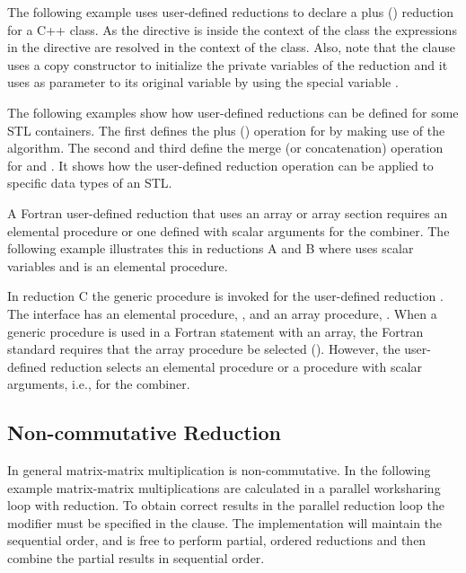 \pagebreak
{}


The following example uses user-defined reductions to declare a plus (\kcode{+}) 
reduction for a C++ class. As the  directive 
is inside the context of the  class the expressions in the 
 directive are resolved in the context of 
the class. Also, note that the  clause uses a copy 
constructor to initialize the private variables of the reduction and it uses 
as parameter to its original variable by using the special variable 
.


The following examples show how user-defined reductions can be defined for 
some STL containers. The first  defines the 
plus (\kcode{+}) operation for  by making use of the 
 algorithm. The second and third define the merge (or 
concatenation) operation for  and . 
It shows how the user-defined reduction operation can be applied to specific 
data types of an STL.


A Fortran user-defined reduction that uses an array or array section requires 
an elemental procedure or one defined with scalar arguments for the combiner.
The following example illustrates this in
reductions A and B where  uses scalar variables and 
is an elemental procedure.

In reduction C the  generic procedure is invoked for the 
user-defined reduction .
The interface  has an elemental procedure, ,
and an array procedure, .
When a generic procedure is used in a Fortran statement with an array, 
the Fortran standard requires that the array procedure be selected 
(). However, the user-defined reduction 
selects an elemental procedure or a procedure with scalar arguments, i.e.,
 for the combiner.


\subsection{Non-commutative Reduction}
\label{subsec:noncommutative_reduction}
In general matrix-matrix multiplication is non-commutative.
In the following example matrix-matrix multiplications are calculated in 
a parallel worksharing loop with reduction.
To obtain correct results in the parallel reduction loop the
 modifier must be specified in the 
 clause. The implementation will maintain
the sequential order, and is free to perform partial, ordered reductions
and then combine the partial results in sequential order.

